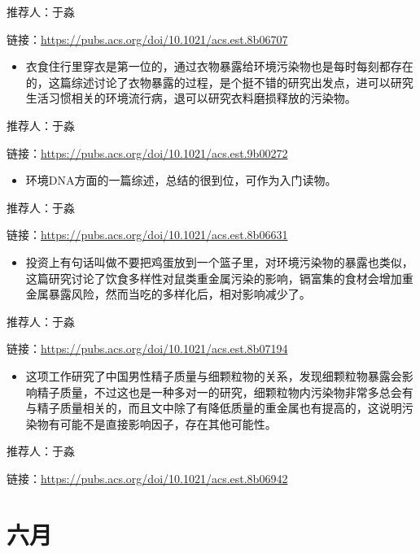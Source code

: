 \documentclass[
]{book}
\providecommand{\tightlist}{%
  \setlength{\itemsep}{0pt}\setlength{\parskip}{0pt}}
\begin{document}
推荐人：于淼

链接：\url{https://pubs.acs.org/doi/10.1021/acs.est.8b06707}

\begin{itemize}
\tightlist
\item
  衣食住行里穿衣是第一位的，通过衣物暴露给环境污染物也是每时每刻都存在的，这篇综述讨论了衣物暴露的过程，是个挺不错的研究出发点，进可以研究生活习惯相关的环境流行病，退可以研究衣料磨损释放的污染物。
\end{itemize}

推荐人：于淼

链接：\url{https://pubs.acs.org/doi/10.1021/acs.est.9b00272}

\begin{itemize}
\tightlist
\item
  环境DNA方面的一篇综述，总结的很到位，可作为入门读物。
\end{itemize}

推荐人：于淼

链接：\url{https://pubs.acs.org/doi/10.1021/acs.est.8b06631}

\begin{itemize}
\tightlist
\item
  投资上有句话叫做不要把鸡蛋放到一个篮子里，对环境污染物的暴露也类似，这篇研究讨论了饮食多样性对鼠类重金属污染的影响，镉富集的食材会增加重金属暴露风险，然而当吃的多样化后，相对影响减少了。
\end{itemize}

推荐人：于淼

链接：\url{https://pubs.acs.org/doi/10.1021/acs.est.8b07194}

\begin{itemize}
\tightlist
\item
  这项工作研究了中国男性精子质量与细颗粒物的关系，发现细颗粒物暴露会影响精子质量，不过这也是一种多对一的研究，细颗粒物内污染物非常多总会有与精子质量相关的，而且文中除了有降低质量的重金属也有提高的，这说明污染物有可能不是直接影响因子，存在其他可能性。
\end{itemize}

推荐人：于淼

链接：\url{https://pubs.acs.org/doi/10.1021/acs.est.8b06942}

\hypertarget{ux516dux6708-1}{%
\section*{六月}\label{ux516dux6708-1}}
\end{document}
